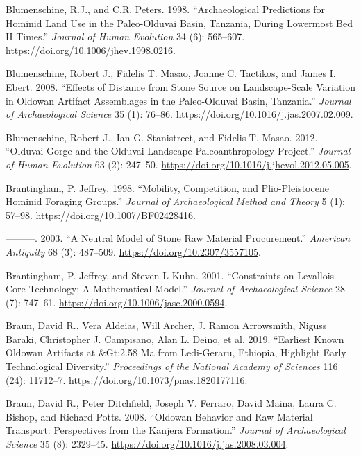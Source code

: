 \documentclass[]{elsarticle} %
\begin{document}
\leavevmode\hypertarget{ref-blumenschineArchaeologicalPredictionsHominid1998}{}%
Blumenschine, R.J., and C.R. Peters. 1998. ``Archaeological Predictions
for Hominid Land Use in the Paleo-Olduvai Basin, Tanzania, During
Lowermost Bed II Times.'' \emph{Journal of Human Evolution} 34 (6):
565--607. \url{https://doi.org/10.1006/jhev.1998.0216}.

\leavevmode\hypertarget{ref-blumenschineEffectsDistanceStone2008}{}%
Blumenschine, Robert J., Fidelis T. Masao, Joanne C. Tactikos, and James
I. Ebert. 2008. ``Effects of Distance from Stone Source on
Landscape-Scale Variation in Oldowan Artifact Assemblages in the
Paleo-Olduvai Basin, Tanzania.'' \emph{Journal of Archaeological
Science} 35 (1): 76--86.
\url{https://doi.org/10.1016/j.jas.2007.02.009}.

\leavevmode\hypertarget{ref-blumenschineOlduvaiGorgeOlduvai2012}{}%
Blumenschine, Robert J., Ian G. Stanistreet, and Fidelis T. Masao. 2012.
``Olduvai Gorge and the Olduvai Landscape Paleoanthropology Project.''
\emph{Journal of Human Evolution} 63 (2): 247--50.
\url{https://doi.org/10.1016/j.jhevol.2012.05.005}.

\leavevmode\hypertarget{ref-brantinghamMobilityCompetitionPlioPleistocene1998}{}%
Brantingham, P. Jeffrey. 1998. ``Mobility, Competition, and
Plio-Pleistocene Hominid Foraging Groups.'' \emph{Journal of
Archaeological Method and Theory} 5 (1): 57--98.
\url{https://doi.org/10.1007/BF02428416}.

\leavevmode\hypertarget{ref-brantinghamNeutralModelStone2003}{}%
---------. 2003. ``A Neutral Model of Stone Raw Material Procurement.''
\emph{American Antiquity} 68 (3): 487--509.
\url{https://doi.org/10.2307/3557105}.

\leavevmode\hypertarget{ref-brantinghamConstraintsLevalloisCore2001}{}%
Brantingham, P. Jeffrey, and Steven L Kuhn. 2001. ``Constraints on
Levallois Core Technology: A Mathematical Model.'' \emph{Journal of
Archaeological Science} 28 (7): 747--61.
\url{https://doi.org/10.1006/jasc.2000.0594}.

\leavevmode\hypertarget{ref-braunEarliestKnownOldowan2019}{}%
Braun, David R., Vera Aldeias, Will Archer, J. Ramon Arrowsmith, Niguss
Baraki, Christopher J. Campisano, Alan L. Deino, et al. 2019. ``Earliest
Known Oldowan Artifacts at \&Gt;2.58 Ma from Ledi-Geraru, Ethiopia,
Highlight Early Technological Diversity.'' \emph{Proceedings of the
National Academy of Sciences} 116 (24): 11712--7.
\url{https://doi.org/10.1073/pnas.1820177116}.

\leavevmode\hypertarget{ref-braunOldowanBehaviorRaw2008}{}%
Braun, David R., Peter Ditchfield, Joseph V. Ferraro, David Maina, Laura
C. Bishop, and Richard Potts. 2008. ``Oldowan Behavior and Raw Material
Transport: Perspectives from the Kanjera Formation.'' \emph{Journal of
Archaeological Science} 35 (8): 2329--45.
\url{https://doi.org/10.1016/j.jas.2008.03.004}.
\end{document}
